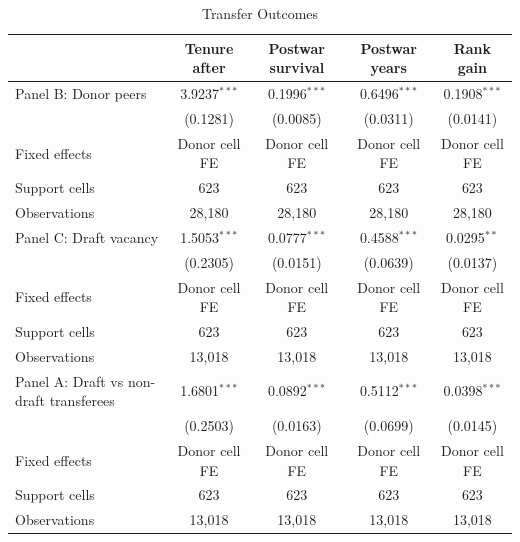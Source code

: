 \begin{table}[htbp]
\centering
\caption{Transfer Outcomes}
\label{tab:transfer-outcomes-combined}
\begin{threeparttable}
\begin{tabular}{lcccc}
\toprule
 & Tenure after & Postwar survival & Postwar years & Rank gain \\
\midrule
Panel B: Donor peers & 3.9237$^{***}$ & 0.1996$^{***}$ & 0.6496$^{***}$ & 0.1908$^{***}$ \\
 & (0.1281) & (0.0085) & (0.0311) & (0.0141) \\
Fixed effects & Donor cell FE & Donor cell FE & Donor cell FE & Donor cell FE \\
Support cells & 623 & 623 & 623 & 623 \\
Observations & 28,180 & 28,180 & 28,180 & 28,180 \\[4pt]
Panel C: Draft vacancy & 1.5053$^{***}$ & 0.0777$^{***}$ & 0.4588$^{***}$ & 0.0295$^{**}$ \\
 & (0.2305) & (0.0151) & (0.0639) & (0.0137) \\
Fixed effects & Donor cell FE & Donor cell FE & Donor cell FE & Donor cell FE \\
Support cells & 623 & 623 & 623 & 623 \\
Observations & 13,018 & 13,018 & 13,018 & 13,018 \\[4pt]
Panel A: Draft vs non-draft transferees & 1.6801$^{***}$ & 0.0892$^{***}$ & 0.5112$^{***}$ & 0.0398$^{***}$ \\
 & (0.2503) & (0.0163) & (0.0699) & (0.0145) \\
Fixed effects & Donor cell FE & Donor cell FE & Donor cell FE & Donor cell FE \\
Support cells & 623 & 623 & 623 & 623 \\
Observations & 13,018 & 13,018 & 13,018 & 13,018 \\[4pt]
\bottomrule
\end{tabular}
\begin{tablenotes}[flushleft]
\footnotesize

\end{tablenotes}
\end{threeparttable}
\end{table}
